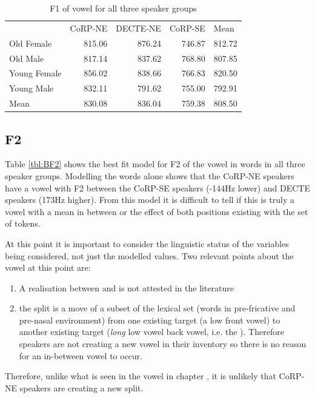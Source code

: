 \documentclass[../../../00.FullDoc/tex/APRReport-year4]{subfiles}
\begin{document}


\begin{table}[htbp]
	\centering
	\begin{tabular}{lrrrr}
		& \multicolumn{1}{l}{CoRP-NE} & \multicolumn{1}{l}{DECTE-NE} & \multicolumn{1}{l}{CoRP-SE} & \multicolumn{1}{l}{Mean} \\
		Old Female & 815.06 & 876.24 & 746.87 & 812.72 \\
		Old Male & 817.14 & 837.62 & 768.80 & 807.85 \\
		Young Female & 856.02 & 838.66 & 766.83 & 820.50 \\
		Young Male & 832.11 & 791.62 & 755.00 & 792.91 \\
		Mean  & 830.08 & 836.04 & 759.38 & 808.50 \\
	\end{tabular}%
	\caption{F1 of \bath{} vowel for all three speaker groups}
	\label{tbl:BF1-inter}%
\end{table}%





\subsection{F2}
Table \ref{tbl:BF2} shows the best fit model for F2 of the vowel in \bath{} words in all three speaker groups. Modelling the \bath{} words alone shows that the CoRP-NE speakers have a vowel with F2 between the CoRP-SE speakers (-144Hz lower) and DECTE speakers (173Hz higher). From this model it is difficult to tell if this is truly a vowel with a mean in between or the effect of both positions existing with the set of tokens. 

 

At this point it is important to consider the linguistic status of the variables being considered, not just the modelled values. Two relevant points about the \bath{} vowel at this point are:
\begin{enumerate}
	\item A \bath{} realisation between \trap{} and \palm{} is not attested in the literature
	\item the \TB{} split is a move of a subset of the \trap{} lexical set (words in pre-fricative and pre-nasal environment) from one existing target (a low front vowel) to another existing target (\textit{long} low vowel back vowel, i.e. the ). Therefore speakers are not creating a new vowel in their inventory so there is no reason for an in-between vowel to occur. 
\end{enumerate}
Therefore, unlike what is seen in the \strutt vowel in chapter \notinsubfile{\ref{ch:FS}}, it is unlikely that CoRP-NE speakers are creating a new split.
\end{document}
